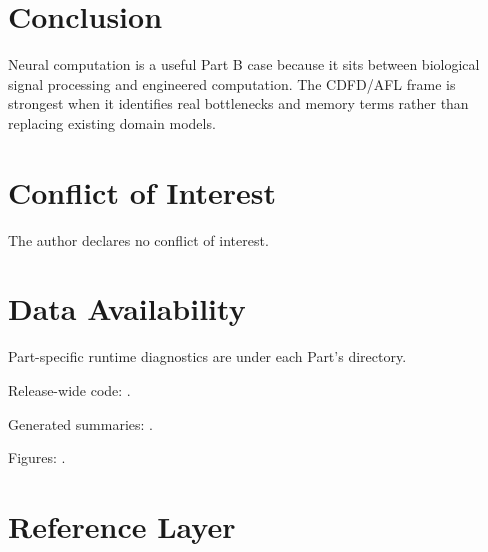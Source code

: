 \documentclass[12pt,a4paper]{article}
\begin{document}

\section{Conclusion}

Neural computation is a useful Part B case because it sits between biological
signal processing and engineered computation. The CDFD/AFL frame is strongest
when it identifies real bottlenecks and memory terms rather than replacing
existing domain models.

\section*{Conflict of Interest}
The author declares no conflict of interest.

\section*{Data Availability}
Part-specific runtime diagnostics are under each Part's  directory.

Release-wide code: .

Generated summaries: .

Figures: .


\section{Reference Layer}



\end{document}
